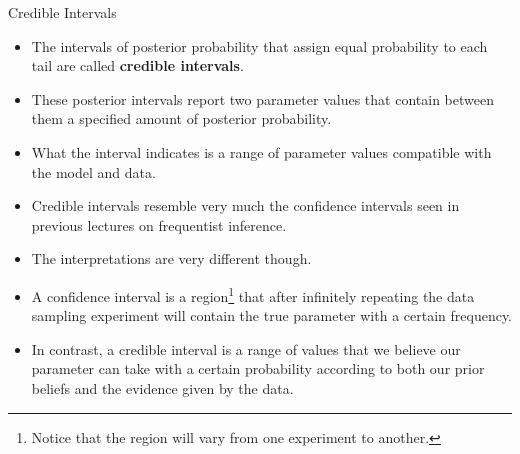 \documentclass[handout]{beamer}
\begin{document}
\begin{frame}[fragile]{Credible Intervals}
\scriptsize{
\begin{itemize}

\item The intervals of posterior probability that assign equal probability to each tail are called \textbf{credible intervals}.

\item These posterior intervals report two parameter values that contain between them a specified amount of posterior probability.

\item What the interval indicates is a range of parameter values compatible with the model and data.

\item Credible intervals resemble very much the confidence intervals seen in previous lectures on frequentist inference.

\item The interpretations are very different though.

\item A confidence interval is a region\footnote{Notice that the region will vary from one experiment to another.} that after infinitely repeating the data sampling experiment will contain the true parameter with a certain frequency.


\item In contrast, a credible interval is a range of values that we believe our parameter can take with a certain probability according to both our prior beliefs and the evidence given by the data.

\end{itemize}



} 

\end{frame}
\end{document}
